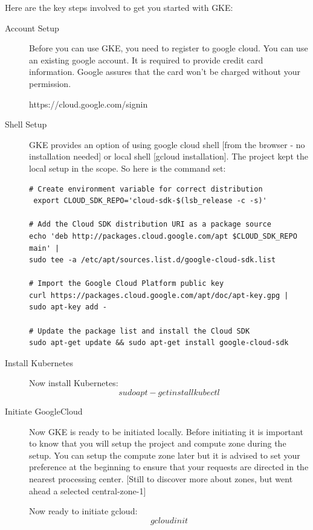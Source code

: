 Here are the key steps involved to get you started with GKE:
\begin{description}
\item[Account Setup] Before you can use GKE, you need to register to google
 cloud. You can use an existing google account. It is required to provide 
 credit card information. 
Google assures that the card won't be charged without your permission.

https://cloud.google.com/signin

\item[Shell Setup] GKE provides an option of using google cloud shell [from the
 browser - no installation needed] 
or local shell [gcloud installation]. The project kept the local setup in the 
scope. So here is the command set:

\begin{lstlisting}
# Create environment variable for correct distribution
 export CLOUD_SDK_REPO='cloud-sdk-$(lsb_release -c -s)'

# Add the Cloud SDK distribution URI as a package source
echo 'deb http://packages.cloud.google.com/apt $CLOUD_SDK_REPO main' | 
sudo tee -a /etc/apt/sources.list.d/google-cloud-sdk.list

# Import the Google Cloud Platform public key
curl https://packages.cloud.google.com/apt/doc/apt-key.gpg | sudo apt-key add -

# Update the package list and install the Cloud SDK
sudo apt-get update && sudo apt-get install google-cloud-sdk
\end{lstlisting}
\item[Install Kubernetes] Now install Kubernetes:
\begin{equation}
sudo apt-get install kubectl
\end{equation}
\item[Initiate GoogleCloud] Now GKE is ready to be initiated locally. Before 
initiating it is 
important to know that you will setup the project and compute zone during the 
setup. You can setup the compute zone later but it is advised to set your 
preference at the beginning to ensure that your requests are directed in the 
nearest processing center. [Still to discover more about zones, but went ahead 
a selected central-zone-1] 

Now ready to initiate gcloud:
\begin{equation}
  gcloud init
\end{equation}


\end{description}
